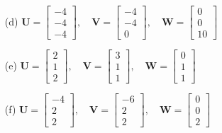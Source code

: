 \begin{enumerate}
    \item[(d)] 
    $\mathbf{U} = \begin{bmatrix} -4 \\ -4 \\ -4 \end{bmatrix}, \quad
    \mathbf{V} = \begin{bmatrix} -4 \\ -4 \\ 0 \end{bmatrix}, \quad
    \mathbf{W} = \begin{bmatrix} 0 \\ 0 \\ 10 \end{bmatrix}$
    
    \item[(e)] 
    $\mathbf{U} = \begin{bmatrix} 2 \\ 1 \\ 2 \end{bmatrix}, \quad
    \mathbf{V} = \begin{bmatrix} 3 \\ 1 \\ 1 \end{bmatrix}, \quad
    \mathbf{W} = \begin{bmatrix} 0 \\ 1 \\ 1 \end{bmatrix}$
    
    \item[(f)] 
    $\mathbf{U} = \begin{bmatrix} -4 \\ 2 \\ 2 \end{bmatrix}, \quad
    \mathbf{V} = \begin{bmatrix} -6 \\ 2 \\ 2 \end{bmatrix}, \quad
    \mathbf{W} = \begin{bmatrix} 0 \\ 0 \\ 2 \end{bmatrix}$
\end{enumerate}